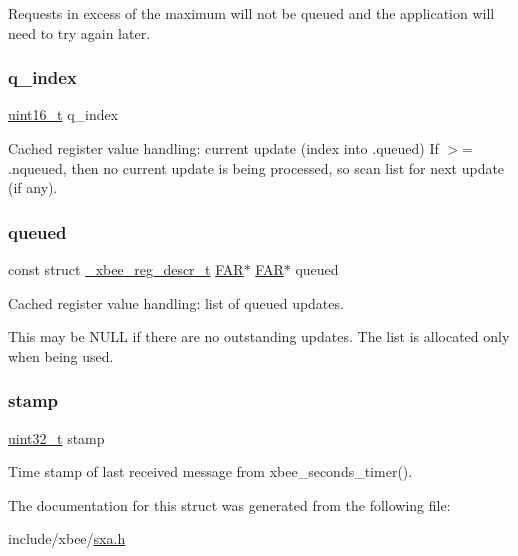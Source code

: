 Requests in excess of the maximum will not be queued and the application will need to try again later. \mbox{\label{structsxa__node__t_a8aa02a31241baba968d2892c98971c65}} 
\subsubsection{\texorpdfstring{q\+\_\+index}{q\_index}}
{\footnotesize\ttfamily \hyperlink{group__hal__dos_ga5a8b2dc9e45a9ee81a94ef304fb62505}{uint16\+\_\+t} q\+\_\+index}



Cached register value handling\+: current update (index into .queued) If $>$= .nqueued, then no current update is being processed, so scan list for next update (if any). 

\mbox{\label{structsxa__node__t_a17615250f94d830781403db708cd68d3}} 
\subsubsection{\texorpdfstring{queued}{queued}}
{\footnotesize\ttfamily const struct \hyperlink{struct__xbee__reg__descr__t}{\+\_\+xbee\+\_\+reg\+\_\+descr\+\_\+t} \hyperlink{group__hal_gaef060b3456fdcc093a7210a762d5f2ed}{F\+AR}$\ast$ \hyperlink{group__hal_gaef060b3456fdcc093a7210a762d5f2ed}{F\+AR}$\ast$ queued}



Cached register value handling\+: list of queued updates. 

This may be N\+U\+LL if there are no outstanding updates. The list is allocated only when being used. \mbox{\label{structsxa__node__t_ac543485164457c0eefd43dcee04c82c6}} 
\subsubsection{\texorpdfstring{stamp}{stamp}}
{\footnotesize\ttfamily \hyperlink{group__hal__dos_ga09a1e304d66d35dd47daffee9731edaa}{uint32\+\_\+t} stamp}



Time stamp of last received message from xbee\+\_\+seconds\+\_\+timer(). 



The documentation for this struct was generated from the following file\+:\begin{DoxyCompactItemize}
\item 
include/xbee/\hyperlink{sxa_8h}{sxa.\+h}\end{DoxyCompactItemize}
